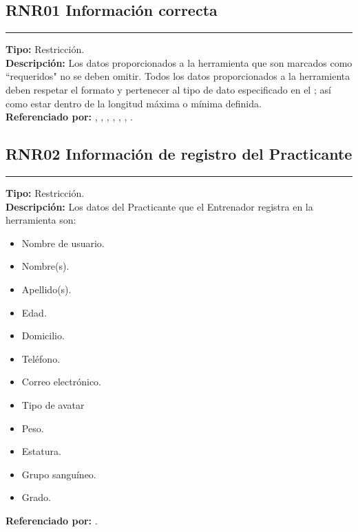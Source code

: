 
\subsection{\normalsize{\textcolor[rgb]{0, 0, 0.545098}{RNR01 Información correcta}}}
\label{rn:RNR01}
\rule[3mm]{16.59cm}{0.1mm} \vspace{1mm}
\textbf{Tipo:} Restricción.\\
\textbf{Descripción:} Los datos proporcionados a la herramienta que son marcados como ``requeridos" no se deben
omitir. Todos los datos proporcionados a la herramienta deben respetar el formato y pertenecer al tipo
de dato especificado en el ; así como estar dentro de la longitud máxima o
mínima definida. \\
\textbf{Referenciado por: } , , , , , , .\\

\subsection{\normalsize{\textcolor[rgb]{0, 0, 0.545098}{RNR02 Información de registro del Practicante}}}
\label{rn:RNR02}
\rule[3mm]{16.59cm}{0.1mm} \vspace{1mm}
\textbf{Tipo:} Restricción.\\
\textbf{Descripción:} Los datos del Practicante que el Entrenador registra en la herramienta son:
\begin{itemize} \itemsep1pt \parskip0pt  \itemsep1pt \parskip0pt 
	\item Nombre de usuario.
	\item Nombre(s).
	\item Apellido(s).
	\item Edad.
	\item Domicilio.
	\item Teléfono.
	\item Correo electrónico.
	\item Tipo de avatar
	\item Peso.
	\item Estatura.
	\item Grupo sanguíneo.
	\item Grado.
\end{itemize}
\textbf{Referenciado por: }  .\\

